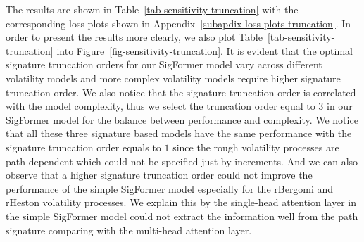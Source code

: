\documentclass[]{article}
\renewcommand{\(}{\left(}
\renewcommand{\)}{\right)}
\begin{document}
	The results are shown in Table~\ref{tab-sensitivity-truncation} with the corresponding loss plots shown in Appendix~\ref{subapdix-loss-plots-truncation}. In order to present the results more clearly, we also plot Table~\ref{tab-sensitivity-truncation} into Figure~\ref{fig-sensitivity-truncation}. It is evident that the optimal signature truncation orders for our SigFormer model vary across different volatility models and more complex volatility models require higher signature truncation order. We also notice that the signature truncation order is correlated with the model complexity, thus we select the truncation order equal to $3$ in our SigFormer model for the balance between performance and complexity. We notice that all these three signature based models have the same performance with the signature truncation order equals to $1$ since the rough volatility processes are path dependent which could not be specified just by increments. And we can also observe that a higher signature truncation order could not improve the performance of the simple SigFormer model especially for the rBergomi and rHeston volatility processes. We explain this by the single-head attention layer in the simple SigFormer model could not extract the information well from the path signature comparing with the multi-head attention layer.
	
\end{document}
